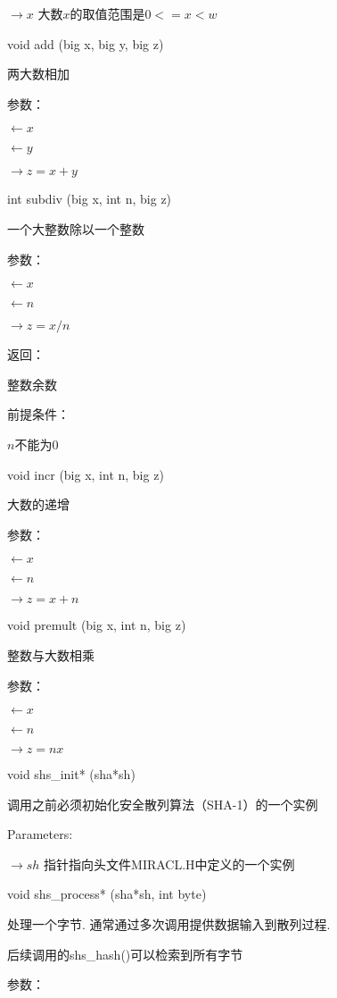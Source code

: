 $\rightarrow x$ 大数$x$的取值范围是$0<=x<w$



void add (big x, big y, big z)

两大数相加

参数：

$\leftarrow x$

$\leftarrow y$

$\rightarrow z =x+y$



int subdiv (big x, int n, big z)

一个大整数除以一个整数

参数：

$\leftarrow x$

$\leftarrow n$

$\rightarrow z =x/n$

返回：

整数余数

前提条件：

$n$不能为0



void incr (big x, int n, big z)

大数的递增

参数：

$\leftarrow x$

$\leftarrow n$

$\rightarrow z =x+n$



void premult (big x, int n, big z)

整数与大数相乘

参数：

$\leftarrow x$

$\leftarrow n$

$\rightarrow z =nx$



void shs\_init* (sha*sh)

调用之前必须初始化安全散列算法（SHA-1）的一个实例

Parameters:

$\rightarrow sh$ 指针指向头文件MIRACL.H中定义的一个实例



void shs\_process* (sha*sh, int byte)

处理一个字节. 通常通过多次调用提供数据输入到散列过程\cite{一些不需要安全通道代理签名的分析与改进}.

后续调用的shs\_hash()可以检索到所有字节

参数：

